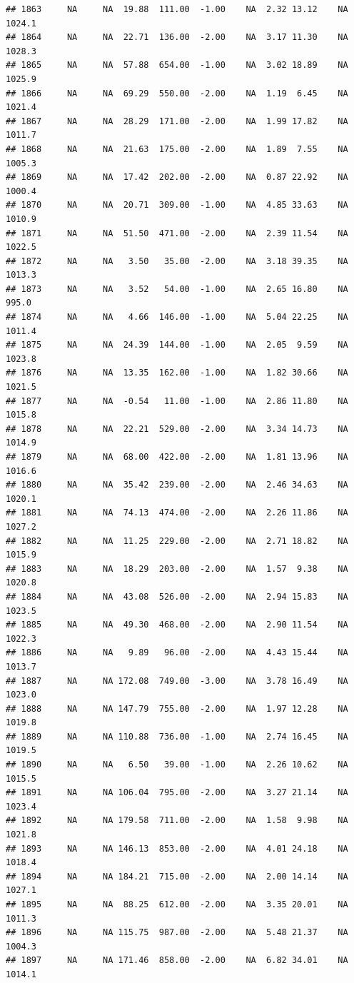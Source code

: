 \documentclass{article}\usepackage{graphicx, color}
\makeatletter
\newenvironment{kframe}{%
 \def\at@end@of@kframe{}%
 \ifinner\ifhmode%
  \def\at@end@of@kframe{\end{minipage}}%
  \begin{minipage}{\columnwidth}%
 \fi\fi%
 \def\FrameCommand##1{\hskip\@totalleftmargin \hskip-\fboxsep
 \colorbox{shadecolor}{##1}\hskip-\fboxsep
     \hskip-\linewidth \hskip-\@totalleftmargin \hskip\columnwidth}%
 \MakeFramed {\advance\hsize-\width
   \@totalleftmargin\z@ \linewidth\hsize
   \@setminipage}}%
 {\par\unskip\endMakeFramed%
 \at@end@of@kframe}
\newenvironment{knitrout}{}{} %
\makeatother
\begin{document}
\begin{knitrout}
\begin{kframe}
\begin{verbatim}
## 1863     NA     NA  19.88  111.00  -1.00    NA  2.32 13.12    NA 1024.1
## 1864     NA     NA  22.71  136.00  -2.00    NA  3.17 11.30    NA 1028.3
## 1865     NA     NA  57.88  654.00  -1.00    NA  3.02 18.89    NA 1025.9
## 1866     NA     NA  69.29  550.00  -2.00    NA  1.19  6.45    NA 1021.4
## 1867     NA     NA  28.29  171.00  -2.00    NA  1.99 17.82    NA 1011.7
## 1868     NA     NA  21.63  175.00  -2.00    NA  1.89  7.55    NA 1005.3
## 1869     NA     NA  17.42  202.00  -2.00    NA  0.87 22.92    NA 1000.4
## 1870     NA     NA  20.71  309.00  -1.00    NA  4.85 33.63    NA 1010.9
## 1871     NA     NA  51.50  471.00  -2.00    NA  2.39 11.54    NA 1022.5
## 1872     NA     NA   3.50   35.00  -2.00    NA  3.18 39.35    NA 1013.3
## 1873     NA     NA   3.52   54.00  -1.00    NA  2.65 16.80    NA  995.0
## 1874     NA     NA   4.66  146.00  -1.00    NA  5.04 22.25    NA 1011.4
## 1875     NA     NA  24.39  144.00  -1.00    NA  2.05  9.59    NA 1023.8
## 1876     NA     NA  13.35  162.00  -1.00    NA  1.82 30.66    NA 1021.5
## 1877     NA     NA  -0.54   11.00  -1.00    NA  2.86 11.80    NA 1015.8
## 1878     NA     NA  22.21  529.00  -2.00    NA  3.34 14.73    NA 1014.9
## 1879     NA     NA  68.00  422.00  -2.00    NA  1.81 13.96    NA 1016.6
## 1880     NA     NA  35.42  239.00  -2.00    NA  2.46 34.63    NA 1020.1
## 1881     NA     NA  74.13  474.00  -2.00    NA  2.26 11.86    NA 1027.2
## 1882     NA     NA  11.25  229.00  -2.00    NA  2.71 18.82    NA 1015.9
## 1883     NA     NA  18.29  203.00  -2.00    NA  1.57  9.38    NA 1020.8
## 1884     NA     NA  43.08  526.00  -2.00    NA  2.94 15.83    NA 1023.5
## 1885     NA     NA  49.30  468.00  -2.00    NA  2.90 11.54    NA 1022.3
## 1886     NA     NA   9.89   96.00  -2.00    NA  4.43 15.44    NA 1013.7
## 1887     NA     NA 172.08  749.00  -3.00    NA  3.78 16.49    NA 1023.0
## 1888     NA     NA 147.79  755.00  -2.00    NA  1.97 12.28    NA 1019.8
## 1889     NA     NA 110.88  736.00  -1.00    NA  2.74 16.45    NA 1019.5
## 1890     NA     NA   6.50   39.00  -1.00    NA  2.26 10.62    NA 1015.5
## 1891     NA     NA 106.04  795.00  -2.00    NA  3.27 21.14    NA 1023.4
## 1892     NA     NA 179.58  711.00  -2.00    NA  1.58  9.98    NA 1021.8
## 1893     NA     NA 146.13  853.00  -2.00    NA  4.01 24.18    NA 1018.4
## 1894     NA     NA 184.21  715.00  -2.00    NA  2.00 14.14    NA 1027.1
## 1895     NA     NA  88.25  612.00  -2.00    NA  3.35 20.01    NA 1011.3
## 1896     NA     NA 115.75  987.00  -2.00    NA  5.48 21.37    NA 1004.3
## 1897     NA     NA 171.46  858.00  -2.00    NA  6.82 34.01    NA 1014.1

\end{verbatim}
\end{kframe}
\end{knitrout}
\end{document}
